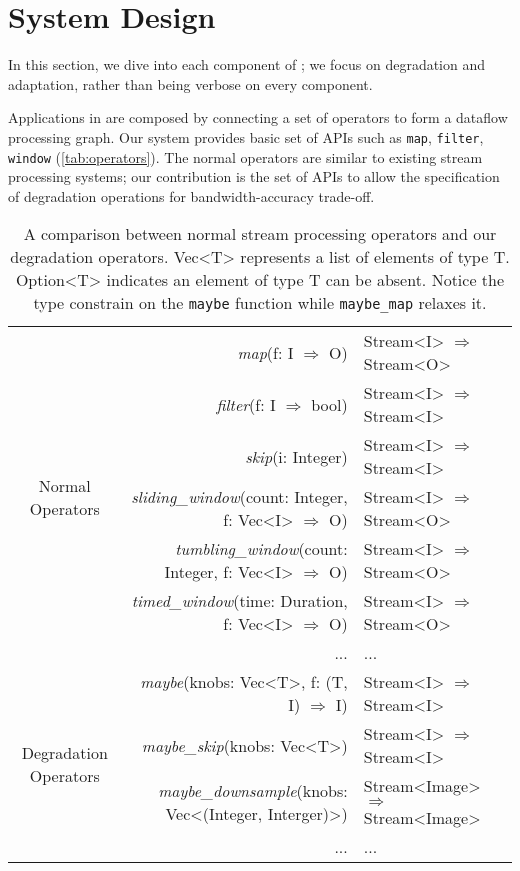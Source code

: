 \section{System Design}
\label{sec:system-design}

In this section, we dive into each component of \sysname{}; we focus on
degradation and adaptation, rather than being verbose on every component.

Applications in \sysname{} are composed by connecting a set of operators to form
a dataflow processing graph. Our system provides basic set of APIs such as
\texttt{map}, \texttt{filter}, \texttt{window} (\autoref{tab:operators}). The
normal operators are similar to existing stream processing systems; our
contribution is the set of APIs to allow the specification of degradation
operations for bandwidth-accuracy trade-off.

\begin{table*}
  \centering
  \begin{tabular}{ c r l }
    \toprule
    \multirow{7}{*}{Normal Operators}
    & \textit{map}(f: I $\Rightarrow$ O) & Stream<I> $\Rightarrow$ Stream<O> \\
    & \textit{filter}(f: I $\Rightarrow$ bool) & Stream<I> $\Rightarrow$
                                                 Stream<I> \\
    & \textit{skip}(i: Integer) & Stream<I> $\Rightarrow$ Stream<I> \\
    & \textit{sliding\_window}(count: Integer, f: Vec<I> $\Rightarrow$ O) & Stream<I> $\Rightarrow$
                                                                            Stream<O> \\
    & \textit{tumbling\_window}(count: Integer, f: Vec<I> $\Rightarrow$ O) & Stream<I> $\Rightarrow$
                                                                             Stream<O> \\
    & \textit{timed\_window}(time: Duration, f: Vec<I> $\Rightarrow$ O) & Stream<I> $\Rightarrow$
                                                                          Stream<O> \\
    & ... & ... \\
    \midrule
    \multirow{4}{*}{Degradation Operators}
    & \textit{maybe}(knobs: Vec<T>, f: (T, I) $\Rightarrow$ I) & Stream<I> $\Rightarrow$
                                                                 Stream<I> \\
    & \textit{maybe\_skip}(knobs: Vec<T>) & Stream<I> $\Rightarrow$ Stream<I> \\
    & \textit{maybe\_downsample}(knobs: Vec<(Integer, Interger)>) & Stream<Image> $\Rightarrow$ Stream<Image> \\
    & ... & ... \\
    \bottomrule
  \end{tabular}
  \caption{A comparison between normal stream processing operators and our
    degradation operators. Vec<T> represents a list of elements of type
    T. Option<T> indicates an element of type T can be absent. Notice the type
    constrain on the \texttt{maybe} function while \texttt{maybe\_map} relaxes
    it.}
  \label{tab:operators}
\end{table*}

